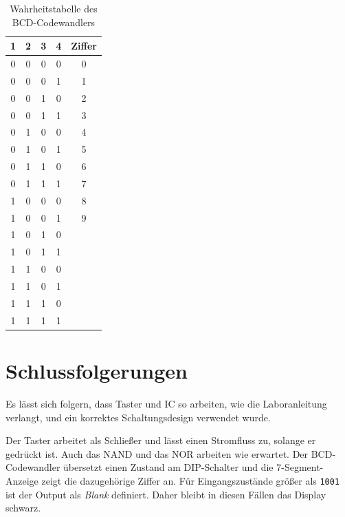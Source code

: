 \documentclass[
    paper=a4,
]{scrartcl}
\begin{document}
    \begin{table}
        \centering
        \caption{Wahrheitstabelle des BCD-Codewandlers}
        \label{tab:3}
        \begin{tabular}{cccc|c}\toprule
            1   &   2   &   3   &   4   &   Ziffer\\\midrule
            0   &   0   &   0   &   0   &   0\\
            0   &   0   &   0   &   1   &   1\\
            0   &   0   &   1   &   0   &   2\\
            0   &   0   &   1   &   1   &   3\\
            0   &   1   &   0   &   0   &   4\\
            0   &   1   &   0   &   1   &   5\\
            0   &   1   &   1   &   0   &   6\\
            0   &   1   &   1   &   1   &   7\\
            1   &   0   &   0   &   0   &   8\\
            1   &   0   &   0   &   1   &   9\\\midrule
            1   &   0   &   1   &   0   &   \\
            1   &   0   &   1   &   1   &   \\
            1   &   1   &   0   &   0   &   \\
            1   &   1   &   0   &   1   &   \\
            1   &   1   &   1   &   0   &   \\
            1   &   1   &   1   &   1   &   \\\bottomrule
        \end{tabular}
    \end{table}

\section{Schlussfolgerungen}
    Es lässt sich folgern, dass Taster und IC so arbeiten, wie die Laboranleitung verlangt, und ein korrektes Schaltungsdesign verwendet wurde.   

    Der Taster arbeitet als Schließer und lässt einen Stromfluss zu, solange er gedrückt ist. Auch das NAND und das NOR arbeiten wie erwartet. Der BCD-Codewandler übersetzt einen Zustand am DIP-Schalter und die 7-Segment-Anzeige zeigt die dazugehörige Ziffer an. Für Eingangszustände größer als \texttt{1001} ist der Output als \textit{Blank} definiert. Daher bleibt in diesen Fällen das Display schwarz.
\end{document}
